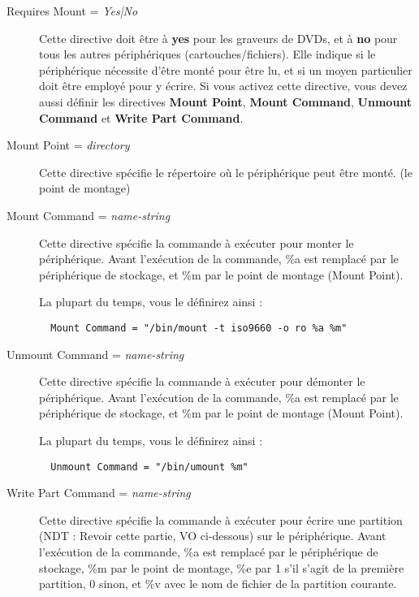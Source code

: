 \begin{description}

\item [Requires Mount = {\it Yes|No}]
   Cette directive doit \^etre \`a {\bf yes} pour les graveurs de DVDs, et \`a {\bf no} 
   pour tous les autres p\'eriph\'eriques (cartouches/fichiers). Elle indique si 
   le p\'eriph\'erique n\'ecessite d'\^etre mont\'e pour \^etre lu, et si un moyen particulier 
   doit \^etre employ\'e pour y \'ecrire. Si vous activez cette directive, vous devez aussi 
   d\'efinir les directives {\bf Mount Point},  {\bf Mount Command}, {\bf Unmount Command} 
   et {\bf Write Part Command}.

\item [Mount Point = {\it directory}]
   Cette directive sp\'ecifie le r\'epertoire o\`u le p\'eriph\'erique peut \^etre mont\'e. 
   (le point de montage)
   
\item [Mount Command = {\it name-string}]
   Cette directive sp\'ecifie la commande \`a ex\'ecuter pour monter le p\'eriph\'erique. 
   Avant l'ex\'ecution de la commande, \%a est remplac\'e par le p\'eriph\'erique de 
   stockage, et \%m par le point de montage (Mount Point).

   La plupart du temps, vous le d\'efinirez ainsi :

\footnotesize
\begin{verbatim}
  Mount Command = "/bin/mount -t iso9660 -o ro %a %m"
\end{verbatim}
\normalsize

\item [Unmount Command = {\it name-string}]
   Cette directive sp\'ecifie la commande \`a ex\'ecuter pour d\'emonter le p\'eriph\'erique. 
   Avant l'ex\'ecution de la commande, \%a est remplac\'e par le p\'eriph\'erique de
   stockage, et \%m par le point de montage (Mount Point).
      
   La plupart du temps, vous le d\'efinirez ainsi :

\footnotesize
\begin{verbatim}
  Unmount Command = "/bin/umount %m"
\end{verbatim}
\normalsize

\item [Write Part Command = {\it name-string}]
   Cette directive sp\'ecifie la commande \`a ex\'ecuter pour  \'ecrire une partition (NDT : Revoir cette partie, VO ci-dessous) 
   sur le p\'eriph\'erique. Avant l'ex\'ecution de la commande, \%a est remplac\'e par le p\'eriph\'erique de
   stockage, \%m par le point de montage, \%e par 1 s'il s'agit de la premi\`ere 
   partition, 0 sinon, et \%v avec le nom de fichier de la partition courante.


\end{description}

